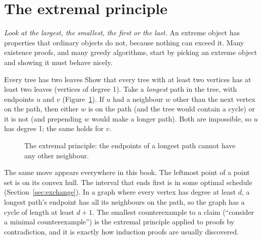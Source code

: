 \section[The extremal principle]{The extremal principle \hfill \silver}\label{sec:extremal}

\emph{Look at the largest, the smallest, the first or the last.} An extreme object has properties that ordinary objects do
not, because nothing can exceed it. Many existence proofs, and many greedy algorithms, start by picking an extreme object
and showing it must behave nicely.

\begin{problem}{Every tree has two leaves}
Show that every tree with at least two vertices has at least two leaves (vertices of degree 1).
\solution Take a \emph{longest} path in the tree, with endpoints $u$ and $v$ (Figure~\ref{fig:extremal}). If $u$ had a
neighbour $w$ other than the next vertex on the path, then either $w$ is on the path (and the tree would contain a cycle) or
it is not (and prepending $w$ would make a longer path). Both are impossible, so $u$ has degree 1; the same holds for $v$.
\end{problem}

\begin{figure}[htbp]
\centering
{}
\caption{The extremal principle: the endpoints of a longest path cannot have any other neighbour.}
\label{fig:extremal}
\end{figure}

The same move appears everywhere in this book. The leftmost point of a point set is on its convex hull. The interval that
ends first is in some optimal schedule (Section~\ref{sec:exchange}). In a graph where every vertex has degree at least $d$,
a longest path's endpoint has all its neighbours on the path, so the graph has a cycle of length at least $d + 1$. The
smallest counterexample to a claim (``consider a minimal counterexample'') is the extremal principle applied to proofs by
contradiction, and it is exactly how induction proofs are usually discovered.

